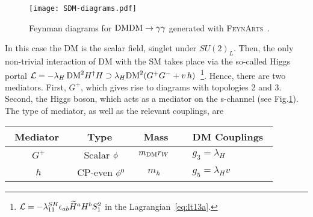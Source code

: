 \begin{figure}[H]
\centering
\texttt{[image: SDM-diagrams.pdf]}
\caption{Feynman diagrams for $\text{DM} \text{DM} \to\gamma\gamma$ generated with \textsc{FeynArts}~\cite{Hahn:2000kx}.}
\label{fig:scalar-to-GG}
\end{figure}

In this case the DM is the scalar field, singlet under $SU(2)_L$. Then, the only non-trivial interaction of DM with the SM takes place via the so-called Higgs portal ${\cal L}= -\lambda_H\, \text{DM}^2 H^\dagger H \supset  \lambda_H \text{DM}^2 ( G^+ G^- + v \,h) $~\footnote{${\cal L}= -\lambda^{SH}_{11}\epsilon_{ab}\widetilde{H}^aH^b S_1^2$ in the Lagrangian~\eqref{eq:lt13a}.}. 
Hence,  there are two mediators. First, $G^+$, which gives rise to diagrams with topologies 2 and 3. Second, the Higgs boson, which acts as a mediator on the s-channel (see Fig.\ref{fig:scalar-to-GG}). The type of mediator, as well as the relevant couplings, are 
%
\begin{table}[H]
	\centering
		\begin{tabular}{ccccl} \hline
%
%
\,\,\,Mediator \,\,\,& \,\,\,Type\,\,\,\,\, &\,\,\, Mass\,\,\, &&DM Couplings\,\,\,\\\hline
%
%
%
$G^+$  & Scalar ${\phi}$& $m_{\text{DM}} r_W $&& $g_3 =\lambda_H$\\
$h$   & CP-even ${\phi^0}$& $m_h$ && $g_5 = \lambda_H v$\\%
\end{tabular}
\end{table}

